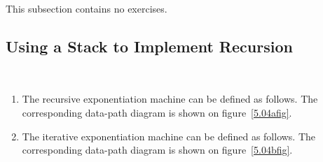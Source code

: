 This subsection contains no exercises.

\subsection{Using a Stack to Implement Recursion}

\begin{exe}[5.4]
    \label{5.04}
    \ \vspace{-20pt}
    \begin{enumerate}
	\item The recursive exponentiation machine can be defined as follows. 
	    The corresponding data-path diagram is shown on figure~\ref{5.04afig}.
	\item The iterative exponentiation machine can be defined as follows. 
	    The corresponding data-path diagram is shown on 
	    figure~\ref{5.04bfig}.
    \end{enumerate}

    \begin{figure}
        \centering
\end{figure}
\end{exe}
